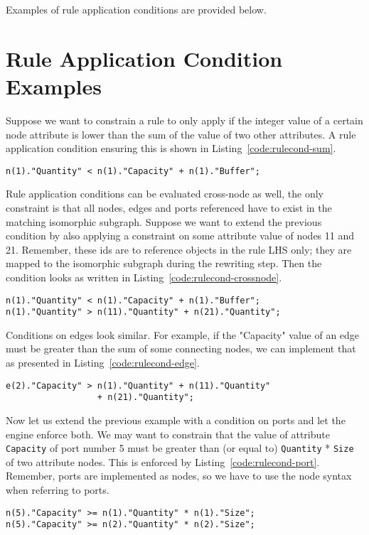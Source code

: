 \documentclass[a4paper,10pt,runningheads]{llncs}
\begin{document}
Examples of rule application conditions are provided below.

\section*{Rule Application Condition Examples}
Suppose we want to constrain a rule to only apply if the integer value of a certain node attribute is lower than the sum of the value of two other attributes.
A rule application condition ensuring this is shown in Listing~\ref{code:rulecond-sum}.
\begin{lstlisting}[caption={Rule application condition example, sum of attributes}, label={code:rulecond-sum}, style=rulecondstyle]
n(1)."Quantity" < n(1)."Capacity" + n(1)."Buffer";
\end{lstlisting}

Rule application conditions can be evaluated cross-node as well, the only constraint is that all nodes,
edges and ports referenced have to exist in the matching isomorphic subgraph.
Suppose we want to extend the previous condition by also applying a constraint on some attribute value of nodes 11 and 21.
Remember, these ids are to reference objects in the rule LHS only; they are mapped to the isomorphic subgraph during the rewriting step.
Then the condition looks as written in Listing~\ref{code:rulecond-crossnode}.
\begin{lstlisting}[caption={Rule application condition example, cross-node}, label={code:rulecond-crossnode}, style=rulecondstyle]
n(1)."Quantity" < n(1)."Capacity" + n(1)."Buffer";
n(1)."Quantity" > n(11)."Quantity" + n(21)."Quantity";
\end{lstlisting}

Conditions on edges look similar. For example, if the "Capacity" value of an edge must be greater than the sum of some connecting nodes,
we can implement that as presented in Listing~\ref{code:rulecond-edge}.
\begin{lstlisting}[caption={Rule application condition example, edge attribute}, label={code:rulecond-edge}, style=rulecondstyle]
e(2)."Capacity" > n(1)."Quantity" + n(11)."Quantity"
                  + n(21)."Quantity";
\end{lstlisting}

Now let us extend the previous example with a condition on ports and let the engine enforce both.
We may want to constrain that the value of attribute {\tt Capacity} of port number 5
must be greater than (or equal to) {\tt Quantity} * {\tt Size} of two attribute nodes.
This is enforced by Listing~\ref{code:rulecond-port}. Remember, ports are implemented as nodes,
so we have to use the node syntax when referring to ports.
\begin{lstlisting}[caption={Rule application condition example, port attribute}, label={code:rulecond-port}, style=rulecondstyle]
n(5)."Capacity" >= n(1)."Quantity" * n(1)."Size";
n(5)."Capacity" >= n(2)."Quantity" * n(2)."Size";
\end{lstlisting}
\end{document}
